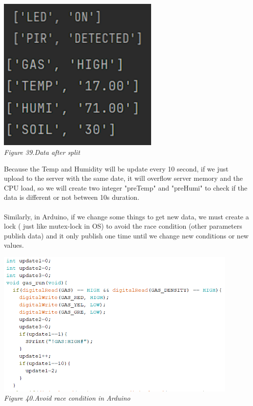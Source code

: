 \documentclass[a4paper]{article}
\begin{document}
\begin{center}
    \includegraphics[width=8cm]{pictures/Data_Split.png}\\
    \textit{Figure 39.Data after split}\\
\end{center}
Because the Temp and Humidity will be update every 10 second, if we just upload to the server with the same date, it will overflow server memory and the CPU load, so we will create two integer "preTemp" and "preHumi" to check if the data is different or not between 10s duration.\\
\\
Similarly, in Arduino, if we change some things to get new data, we must create a lock ( just like mutex-lock in OS) to avoid the race condition (other parameters publish data) and it only publish one time until we change new conditions or new values.\\ 
\begin{center}
    \includegraphics[width=12cm]{pictures/ArduinoSendData.png}\\
    \textit{Figure 40.Avoid race condition in Arduino}\\
\end{center}
\newpage
\end{document}

